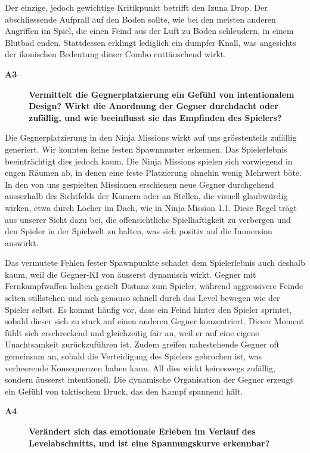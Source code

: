\documentclass[../Main.tex]{subfiles}
\begin{document}
Der einzige, jedoch gewichtige Kritikpunkt betrifft den Izuna Drop. Der abschliessende Aufprall auf den Boden sollte, wie bei den meisten anderen Angriffen im Spiel, die einen Feind aus der Luft zu Boden schleudern, in einem Blutbad enden. Stattdessen erklingt lediglich ein dumpfer Knall, was angesichts der ikonischen Bedeutung dieser Combo enttäuschend wirkt.

\begin{description}
    \item[\textbf{A3}] \textbf{Vermittelt die Gegnerplatzierung ein Gefühl von intentionalem Design? Wirkt die Anordnung der Gegner durchdacht oder zufällig, und wie beeinflusst sie das Empfinden des Spielers?}
\end{description}

Die Gegnerplatzierung in den Ninja Missions wirkt auf uns grösstenteils zufällig generiert. Wir konnten keine festen Spawnmuster erkennen. Das Spielerlebnis beeinträchtigt dies jedoch kaum. Die Ninja Missions spielen sich vorwiegend in engen Räumen ab, in denen eine feste Platzierung ohnehin wenig Mehrwert böte. In den von uns gespielten Missionen erschienen neue Gegner durchgehend ausserhalb des Sichtfelds der Kamera oder an Stellen, die visuell glaubwürdig wirken, etwa durch Löcher im Dach, wie in Ninja Mission 1.1. Diese Regel trägt aus unserer Sicht dazu bei, die offensichtliche Spielhaftigkeit zu verbergen und den Spieler in der Spielwelt zu halten, was sich positiv auf die Immersion auswirkt.

Das vermutete Fehlen fester Spawnpunkte schadet dem Spielerlebnis auch deshalb kaum, weil die Gegner-KI von  äusserst dynamisch wirkt. Gegner mit Fernkampfwaffen halten gezielt Distanz zum Spieler, während aggressivere Feinde selten stillstehen und sich genauso schnell durch das Level bewegen wie der Spieler selbst. Es kommt häufig vor, dass ein Feind hinter den Spieler sprintet, sobald dieser sich zu stark auf einen anderen Gegner konzentriert. Dieser Moment fühlt sich erschreckend und gleichzeitig fair an, weil er auf eine eigene Unachtsamkeit zurückzuführen ist. Zudem greifen nahestehende Gegner oft gemeinsam an, sobald die Verteidigung des Spielers gebrochen ist, was verheerende Konsequenzen haben kann. All dies wirkt keineswegs zufällig, sondern äusserst intentionell. Die dynamische Organisation der Gegner erzeugt ein Gefühl von taktischem Druck, das den Kampf spannend hält.

\begin{description}
    \item[\textbf{A4}] \textbf{Verändert sich das emotionale Erleben im Verlauf des Levelabschnitts, und ist eine Spannungskurve erkennbar?}
\end{description}
\end{document}
